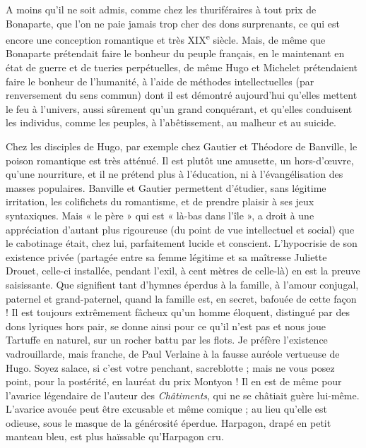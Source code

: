 \documentclass[french,twoside]{book} %
\begin{document}
A moins qu’il ne soit admis, comme chez les thuriféraires à tout prix de Bonaparte, que l’on ne paie jamais trop cher des dons surprenants, ce qui est encore une conception romantique et très XIX\textsuperscript{e} siècle. Mais, de même que Bonaparte prétendait faire le bonheur du peuple français, en le maintenant en état de guerre et de tueries perpétuelles, de même Hugo et Michelet prétendaient faire le bonheur de l’humanité, à l’aide de méthodes intellectuelles (par renversement du sens commun) dont il est démontré aujourd’hui qu’elles mettent le feu à l’univers, aussi sûrement qu’un grand conquérant, et qu’elles conduisent les individus, comme les peuples, à l’abêtissement, au malheur et au suicide.\par
Chez les disciples de Hugo, par exemple chez Gautier et Théodore de Banville, le poison romantique est très atténué. Il est plutôt une amusette, un hors-d’œuvre, qu’une nourriture, et il ne prétend plus à l’éducation, ni à l’évangélisation des masses populaires. Banville et Gautier permettent d’étudier, sans légitime irritation, les colifichets du romantisme, et de prendre plaisir à ses jeux syntaxiques. Mais « le père » qui est « là-bas dans l’île », a droit à une appréciation d’autant plus rigoureuse (du point de vue intellectuel et social) que le cabotinage était, chez lui, parfaitement lucide et conscient. L’hypocrisie de son existence privée (partagée entre sa femme légitime et sa maîtresse Juliette Drouet, celle-ci installée, pendant l’exil, à cent mètres de celle-là) en est la preuve saisissante. Que signifient tant d’hymnes éperdus à la famille, à l’amour conjugal, paternel et grand-paternel, quand la famille est, en secret, bafouée de cette façon ! Il est toujours extrêmement fâcheux qu’un homme éloquent, distingué par des dons lyriques hors pair, se donne ainsi pour ce qu’il n’est pas et nous joue Tartuffe en naturel, sur un rocher battu par les flots. Je préfère l’existence vadrouillarde, mais franche, de Paul Verlaine à la fausse auréole vertueuse de Hugo. Soyez salace, si c’est votre penchant, sacreblotte ; mais ne vous posez point, pour la postérité, en lauréat du prix Montyon ! Il en est de même pour l’avarice légendaire de l’auteur des {\itshape Châtiments}, qui ne se châtiait guère lui-même. L’avarice avouée peut être excusable et même comique ; au lieu qu’elle est odieuse, sous le masque de la générosité éperdue. Harpagon, drapé en petit manteau bleu, est plus haïssable qu’Harpagon cru.\par
\end{document}
